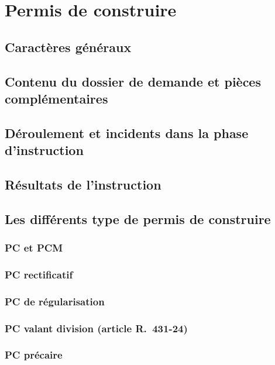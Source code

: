 \chapter{Permis de construire}

\section{Caractères généraux}

\section{Contenu du dossier de demande et pièces complémentaires}

\section{Déroulement et incidents dans la phase d'instruction}

\section{Résultats de l'instruction}

\section{Les différents type de permis de construire}

	\subsection{PC et PCM}
	
	\subsection{PC rectificatif}
	
	\subsection{PC de régularisation}
	
	\subsection{PC valant division (article R.~431-24)}
	
	\subsection{PC précaire}
	
